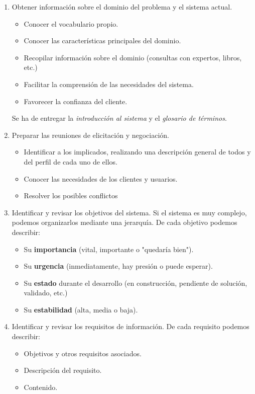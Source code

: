 \documentclass[12pt,spanish]{article}
\begin{document}
\begin{enumerate}
	\item Obtener información sobre el dominio del problema y el sistema actual.
		\begin{itemize}
			\item Conocer el vocabulario propio.
			\item Conocer las características principales del dominio.
			\item Recopilar información sobre el dominio (consultas con expertos, libros, etc.)
			\item Facilitar la comprensión de las necesidades del sistema.
			\item Favorecer la confianza del cliente.
		\end{itemize}
	Se ha de entregar la \emph{introducción al sistema} y el \emph{glosario de términos}.
	\item Preparar las reuniones de elicitación y negociación.
		\begin{itemize}
			\item Identificar a los implicados, realizando una descripción general de todos y del perfil de cada uno de ellos.
			\item Conocer las necesidades de los clientes y usuarios.
			\item Resolver los posibles conflictos
		\end{itemize}
	\item Identificar y revisar los objetivos del sistema. Si el sistema es muy complejo, podemos organizarlos mediante una jerarquía. De cada objetivo podemos describir:
		\begin{itemize}
			\item Su \textbf{importancia} (vital, importante o "quedaría bien").
			\item Su \textbf{urgencia} (inmediatamente, hay presión o puede esperar).
			\item Su \textbf{estado} durante el desarrollo (en construcción, pendiente de solución, validado, etc.)
			\item Su \textbf{estabilidad} (alta, media o baja).
		\end{itemize}
	\item Identificar y revisar los requisitos de información. De cada requisito podemos describir:
		\begin{itemize}
			\item Objetivos y otros requisitos asociados.
			\item Descripción del requisito.
			\item Contenido.

\end{itemize}
\end{enumerate}
\end{document}
